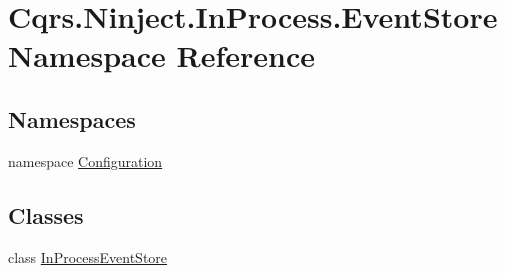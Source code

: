 \hypertarget{namespaceCqrs_1_1Ninject_1_1InProcess_1_1EventStore}{}\section{Cqrs.\+Ninject.\+In\+Process.\+Event\+Store Namespace Reference}
\label{namespaceCqrs_1_1Ninject_1_1InProcess_1_1EventStore}
\subsection*{Namespaces}
\begin{DoxyCompactItemize}
\item 
namespace \hyperlink{namespaceCqrs_1_1Ninject_1_1InProcess_1_1EventStore_1_1Configuration}{Configuration}
\end{DoxyCompactItemize}
\subsection*{Classes}
\begin{DoxyCompactItemize}
\item 
class \hyperlink{classCqrs_1_1Ninject_1_1InProcess_1_1EventStore_1_1InProcessEventStore}{In\+Process\+Event\+Store}
\end{DoxyCompactItemize}

